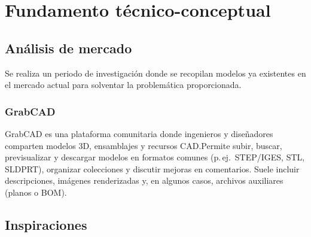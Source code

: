 \section{Fundamento técnico-conceptual}

\subsection{Análisis de mercado}
Se realiza un periodo de investigación donde se recopilan modelos ya existentes en el mercado actual para solventar la problemática proporcionada.


\subsubsection{GrabCAD}
GrabCAD es una plataforma comunitaria donde ingenieros y diseñadores comparten modelos 3D, ensamblajes y recursos CAD.\@ Permite subir, buscar, previsualizar y descargar modelos en formatos comunes (p.\,ej.\ STEP/IGES, STL, SLDPRT), organizar colecciones y discutir mejoras en comentarios. Suele incluir descripciones, imágenes renderizadas y, en algunos casos, archivos auxiliares (planos o BOM).


\subsection{Inspiraciones}

